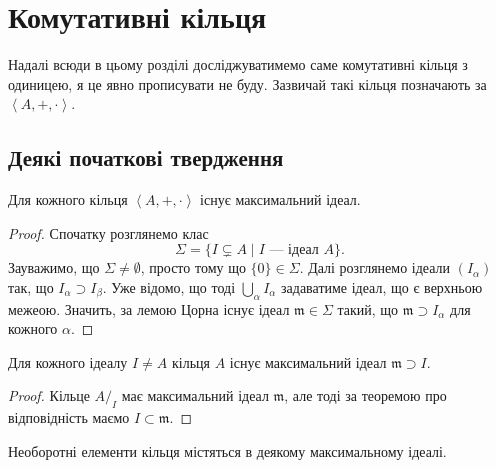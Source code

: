 \documentclass{math_library}
\begin{document}

\section{Комутативні кільця}
Надалі всюди в цьому розділі досліджуватимемо саме комутативні кільця з одиницею, я це явно прописувати не буду. Зазвичай такі кільця позначають за $\left<A,+,\cdot\right>$.

\subsection{Деякі початкові твердження}
\begin{proposition}
Для кожного кільця $\left<A,+,\cdot\right>$ існує максимальний ідеал.
\end{proposition}

\begin{proof}
Спочатку розглянемо клас
\[
\Sigma = \{ I \subsetneq A \mid I \text{ --- ідеал $A$} \}.
\]
Зауважимо, що $\Sigma \neq \emptyset$, просто тому що $\{0\} \in \Sigma$. Далі розглянемо ідеали $(I_\alpha)$ так, що $I_\alpha \supset I_\beta$. Уже відомо, що тоді $\displaystyle\bigcup_{\alpha} I_\alpha$ задаватиме ідеал, що є верхньою межеою. Значить, за лемою Цорна існує ідеал $\mathfrak{m} \in \Sigma$ такий, що $\mathfrak{m} \supset I_\alpha$ для кожного $\alpha$.
\end{proof}

\begin{proposition}
Для кожного ідеалу $I \neq A$ кільця $A$ існує максимальний ідеал $\mathfrak{m} \supset I$.
\end{proposition}

\begin{proof}
Кільце $A/_I$ має максимальний ідеал $\mathfrak{m}$, але тоді за теоремою про відповідність маємо $I \subset \mathfrak{m}$.
\end{proof}

\begin{proposition}
Необоротні елементи кільця містяться в деякому максимальному ідеалі.
\end{proposition}
\end{document}
